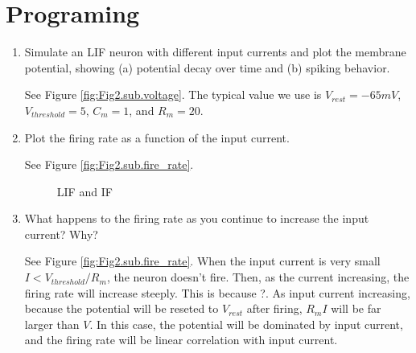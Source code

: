 \documentclass[11pt]{article}
\begin{document}
	\section*{Programing}
	\begin{enumerate}
		\item Simulate an LIF neuron with different input currents and plot the membrane potential, showing (a) potential decay over time and (b) spiking behavior.

        \cite{Ermentrout_2010}
		See Figure \ref{fig:Fig2.sub.voltage}. The typical value we use is $V_{rest} = -65 mV$, $V_{threshold} = 5$, $C_m = 1$, and $R_m = 20$. 
		
		\item Plot the firing rate as a function of the input current.
		
		See Figure \ref{fig:Fig2.sub.fire_rate}.
		
		\begin{figure}[htb]
			\centering
			\caption{LIF and IF}
		\end{figure}
		
		\item What happens to the firing rate as you continue to increase the input current? Why?
		
		See Figure \ref{fig:Fig2.sub.fire_rate}. When the input current is very small $I < V_{threshold}/R_m$, the neuron doesn't fire. Then, as the current increasing, the firing rate will increase steeply. This is because ?. As input current increasing, because the potential will be reseted to $V_{rest}$ after firing, $R_mI$ will be far larger than $V$. In this case, the potential will be dominated by input current, and the firing rate will be linear correlation with input current.
		

\end{enumerate}
\end{document}
